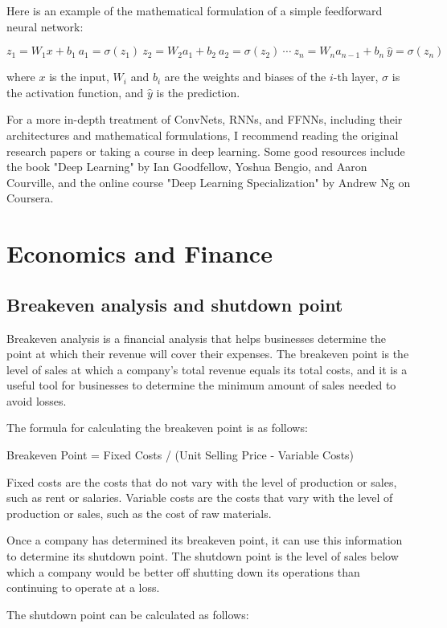 \documentclass[12pt, a4paper, oneside]{article}
\begin{document}
Here is an example of the mathematical formulation of a simple feedforward neural network:

\begin{equation}
z_1 = W_1 x + b_1 \
a_1 = \sigma(z_1) \
z_2 = W_2 a_1 + b_2 \
a_2 = \sigma(z_2) \
\cdots \
z_n = W_n a_{n-1} + b_n \
\hat{y} = \sigma(z_n)
\end{equation}

where $x$ is the input, $W_i$ and $b_i$ are the weights and biases of the $i$-th layer, $\sigma$ is the activation function, and $\hat{y}$ is the prediction.

For a more in-depth treatment of ConvNets, RNNs, and FFNNs, including their architectures and mathematical formulations, I recommend reading the original research papers or taking a course in deep learning. Some good resources include the book "Deep Learning" by Ian Goodfellow, Yoshua Bengio, and Aaron Courville, and the online course "Deep Learning Specialization" by Andrew Ng on Coursera.
\section{ Economics and Finance}
\subsection{ Breakeven analysis and shutdown point }
Breakeven analysis is a financial analysis that helps businesses determine the point at which their revenue will cover their expenses. The breakeven point is the level of sales at which a company's total revenue equals its total costs, and it is a useful tool for businesses to determine the minimum amount of sales needed to avoid losses.

The formula for calculating the breakeven point is as follows:

Breakeven Point = Fixed Costs / (Unit Selling Price - Variable Costs)

Fixed costs are the costs that do not vary with the level of production or sales, such as rent or salaries. Variable costs are the costs that vary with the level of production or sales, such as the cost of raw materials.

Once a company has determined its breakeven point, it can use this information to determine its shutdown point. The shutdown point is the level of sales below which a company would be better off shutting down its operations than continuing to operate at a loss.

The shutdown point can be calculated as follows:
\end{document}
